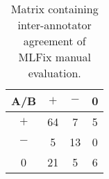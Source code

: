 \begin{table*}[t]
\centering
\small

\begin{tabular}{c|cc|c}
 A/B  &  $+$  &  $-$  &  0  \\
\hline
$+$  &  64  &  7  &  5  \\
$-$  &  5  &  13  &  0  \\
\hline
0 &  21  &  5  &  6  \\
\end{tabular}
\caption[Czech MLFix manual evaluation - inter-annotator agreement]{
	Matrix containing inter-annotator agreement of MLFix manual evaluation.
}
\label{maneval-agree}
\end{table*}

